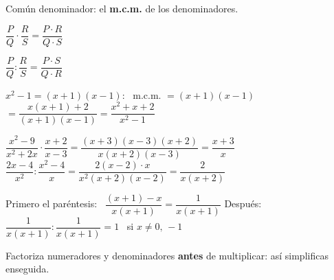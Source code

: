 \documentclass[11pt,a4paper]{article}
\newcommand{\comic}{\fontfamily{ComicNeue-TLF}\selectfont}
\newcommand{\nota}[1]{{\comic\small\color{fmex!85!black}#1}}
\begin{document}
\vfill
\begin{tcbraster}[raster columns=3,raster equal height,raster column skip=8pt]
\begin{tcolorbox}[fmbase,colback=fmdefbg,colframe=fmdef,coltitle=white,title={Suma y resta}]
Común denominador: el \textbf{m.c.m.} de los denominadores.
\end{tcolorbox}
\begin{tcolorbox}[fmbase,colback=fmdefbg,colframe=fmdef,coltitle=white,title={Producto},before upper=\centering]
$\dfrac PQ\cdot\dfrac RS=\dfrac{P\cdot R}{Q\cdot S}$
\end{tcolorbox}
\begin{tcolorbox}[fmbase,colback=fmdefbg,colframe=fmdef,coltitle=white,title={Cociente},before upper=\centering]
$\dfrac PQ:\dfrac RS=\dfrac{P\cdot S}{Q\cdot R}$
\end{tcolorbox}
\end{tcbraster}

\vfill
\begin{exemple}
$x^2-1=(x+1)(x-1)$: \ m.c.m. $=(x+1)(x-1)$ \qquad $=\dfrac{x(x+1)+2}{(x+1)(x-1)}=\boxed{\dfrac{x^2+x+2}{x^2-1}}$
\end{exemple}

\vfill
\begin{exemple}
$\dfrac{x^2-9}{x^2+2x}\cdot\dfrac{x+2}{x-3}=\dfrac{(x+3)(x-3)(x+2)}{x(x+2)(x-3)}=\boxed{\dfrac{x+3}{x}}$ \qquad
$\dfrac{2x-4}{x^2}:\dfrac{x^2-4}{x}=\dfrac{2(x-2)\cdot x}{x^2(x+2)(x-2)}=\boxed{\dfrac{2}{x(x+2)}}$
\end{exemple}

\vfill
\begin{exemple}
Primero el paréntesis: \ $\dfrac{(x+1)-x}{x(x+1)}=\dfrac{1}{x(x+1)}$ \qquad Después: \ $\dfrac{1}{x(x+1)}:\dfrac{1}{x(x+1)}=\boxed{1}$ \ \nota{si $x\neq0,\,-1$}
\end{exemple}

\vfill
\begin{truc}
Factoriza numeradores y denominadores \textbf{antes} de multiplicar: así simplificas enseguida.
\end{truc}
\end{document}
